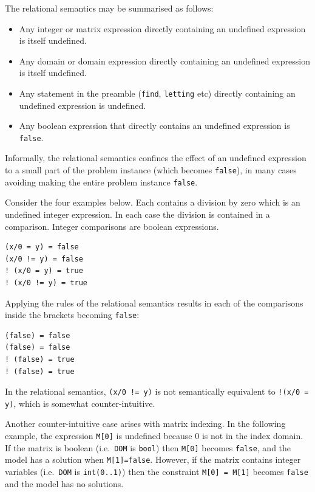 \documentclass[a4paper]{article}
\begin{document}
The relational semantics may be summarised as follows:
\begin{itemize}
\item Any integer or matrix expression directly containing an undefined expression is itself undefined.
\item Any domain or domain expression directly containing an undefined expression is itself undefined.
\item Any statement in the preamble (\texttt{find}, \texttt{letting} etc) directly containing an undefined expression is undefined. 
\item Any boolean expression that directly contains an undefined expression is \texttt{false}. 
\end{itemize}

Informally, the relational semantics confines the effect of an undefined expression
to a small part of the problem instance (which becomes \texttt{false}), in many cases avoiding
making the entire problem instance \texttt{false}.

Consider the four examples below. Each contains a division by zero which is an undefined
integer expression. In each case the division is contained in a comparison. Integer
comparisons are boolean expressions. 

\begin{verbatim}
(x/0 = y) = false
(x/0 != y) = false
! (x/0 = y) = true
! (x/0 != y) = true
\end{verbatim}

Applying the rules of the relational semantics results in each of the comparisons inside the brackets 
becoming \texttt{false}:

\begin{verbatim}
(false) = false
(false) = false
! (false) = true
! (false) = true
\end{verbatim}

In the relational semantics, \texttt{(x/0 != y)} is not semantically equivalent to \texttt{!(x/0 = y)},
which is somewhat counter-intuitive. 

Another counter-intuitive case arises with matrix indexing. In the following example,
the expression \texttt{M[0]} is undefined because 0 is not in the index domain. 
If the matrix is boolean (i.e.\ \texttt{DOM} is \texttt{bool}) then \texttt{M[0]}
becomes \texttt{false}, and the model has a solution when \texttt{M[1]=false}.
However, if the matrix contains integer variables (i.e.\ \texttt{DOM} is \texttt{int(0..1)})
then the constraint \texttt{M[0] = M[1]} becomes \texttt{false} and the model has no solutions. 
\end{document}
